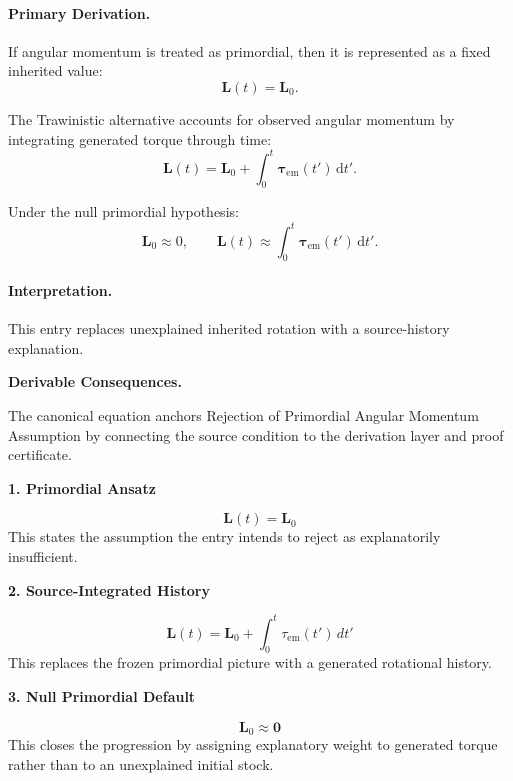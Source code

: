 \paragraph{Primary Derivation.}
If angular momentum is treated as primordial, then it is represented as a fixed inherited value:
\begin{equation}
\mathbf{L}(t)=\mathbf{L}_0.
\end{equation}

The Trawinistic alternative accounts for observed angular momentum by integrating generated torque through time:
\begin{equation}
\mathbf{L}(t)
=
\mathbf{L}_0
+
\int_0^t
\boldsymbol{\tau}_{\mathrm{em}}(t')
\,\mathrm{d}t' .
\end{equation}

Under the null primordial hypothesis:
\begin{equation}
\boxed{
\mathbf{L}_0\approx 0,
\qquad
\mathbf{L}(t)
\approx
\int_0^t
\boldsymbol{\tau}_{\mathrm{em}}(t')
\,\mathrm{d}t' .
}
\end{equation}

\paragraph{Interpretation.}
This entry replaces unexplained inherited rotation with a source-history explanation.

\par\vspace{0.35em}
\noindent\textbf{Derivable Consequences.}\quad
\begingroup
\footnotesize
\raggedright
The canonical equation anchors Rejection of Primordial Angular Momentum Assumption by connecting the source condition to the derivation layer and proof certificate.
\par\endgroup

\noindent\textbf{1. Primordial Ansatz}\par
\[
\mathbf{L}(t)=\mathbf{L}_0
\]
\noindent This states the assumption the entry intends to reject as explanatorily insufficient.\par
\noindent\textbf{2. Source-Integrated History}\par
\[
\mathbf{L}(t)=\mathbf{L}_0 + \int_{0}^{t}\tau_{\mathrm{em}}(t')\,dt'
\]
\noindent This replaces the frozen primordial picture with a generated rotational history.\par
\noindent\textbf{3. Null Primordial Default}\par
\[
\mathbf{L}_0 \approx \mathbf{0}
\]
\noindent This closes the progression by assigning explanatory weight to generated torque rather than to an unexplained initial stock.\par

